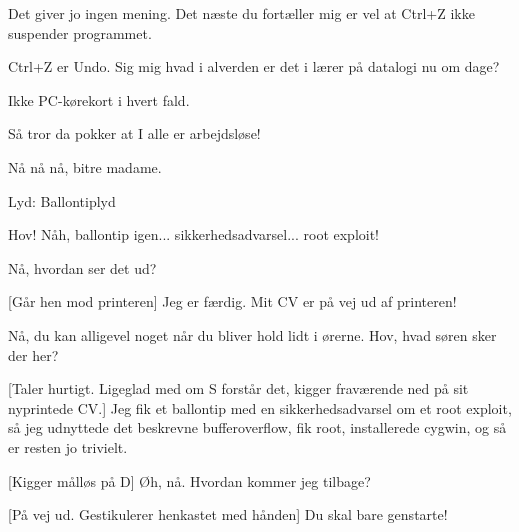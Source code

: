 \documentclass[a4paper,11pt]{article}
\begin{document}
\begin{sketch}
 Det giver jo ingen mening. Det næste du fortæller mig er vel at Ctrl+Z ikke suspender programmet.

 Ctrl+Z er Undo. Sig mig hvad i alverden er det i lærer på datalogi nu om dage?

 Ikke PC-kørekort i hvert fald.

 Så tror da pokker at I alle er arbejdsløse!


  Nå nå nå, bitre madame. 

\scene Lyd: Ballontiplyd

 Hov! Nåh, ballontip igen... sikkerhedsadvarsel... root exploit!



 Nå, hvordan ser det ud?

[Går hen mod printeren] Jeg er færdig. Mit CV er på vej ud af printeren!

 Nå, du kan alligevel noget når du bliver hold lidt i ørerne.  Hov, hvad søren sker der her?

[Taler hurtigt. Ligeglad med om S forstår det, kigger fraværende ned på sit nyprintede CV.] Jeg fik et ballontip med en sikkerhedsadvarsel om et root exploit, så jeg udnyttede det beskrevne bufferoverflow, fik root, installerede cygwin, og så er resten jo trivielt.

[Kigger målløs på D] Øh, nå. Hvordan kommer jeg tilbage?

[På vej ud. Gestikulerer henkastet med hånden] Du skal bare genstarte!


\end{sketch}
\end{document}
